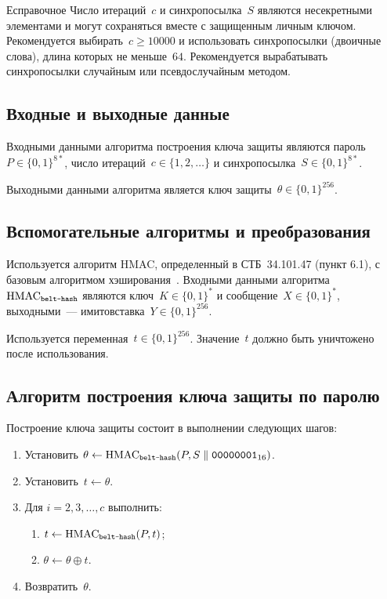 \begin{appendix}{Е}{справочное}
Число итераций~$c$ и синхропосылка~$S$ являются несекретными элементами
и могут сохраняться вместе с защищенным личным ключом.
%
Рекомендуется выбирать~$c\geq 10000$ и
использовать синхропосылки (двоичные слова), 
длина которых не меньше~$64$. 
%
Рекомендуется вырабатывать синхропосылки случайным 
или псевдослучайным методом.


\label{PASSWORD.PBKDF}

\subsection{Входные и выходные данные}
\label{PASSWORD.PBKDF.IO}

Входными данными алгоритма построения ключа защиты являются
пароль~$P\in\{0,1\}^{8*}$, 
число итераций~$c\in\{1,2,\ldots\}$
и синхропосылка~$S\in\{0,1\}^{8*}$.

Выходными данными алгоритма является ключ 
защиты~$\theta\in\{0,1\}^{256}$.
  
\subsection{Вспомогательные алгоритмы и преобразования}
\label{PASSWORD.PBKDF.Aux}
 
Используется алгоритм HMAC,
определенный в СТБ~34.101.47 (пункт 6.1),
с базовым алгоритмом хэширования~.
Входными данными алгоритма~$\text{\normalfont HMAC}_{\texttt{belt-hash}}$ являются 
ключ~$K\in\{0,1\}^*$ и сообщение~$X\in\{0,1\}^*$,
выходными~--- имитовставка~$Y\in\{0,1\}^{256}$.

Используется переменная~$t\in\{0,1\}^{256}$.
Значение~$t$ должно быть уничтожено после использования.

\subsection{Алгоритм построения ключа защиты по паролю}
\label{PASSWORD.PBKDF.Alg}

Построение ключа защиты состоит в выполнении следующих шагов:
\begin{enumerate}
\item
Установить
$\theta\leftarrow\text{\normalfont HMAC}_{\texttt{belt-hash}}
(P,S\parallel \texttt{00000001}_{16})$.
\item
Установить~$t\leftarrow \theta$.
\item
Для $i=2,3,\ldots,c$ выполнить:
\begin{enumerate}
\item
$t\leftarrow\text{\normalfont HMAC}_{\texttt{belt-hash}}(P,t)$;
\item
$\theta\leftarrow\theta\oplus t$.
\end{enumerate}
\item
Возвратить~$\theta$.
\end{enumerate}


\end{appendix}
